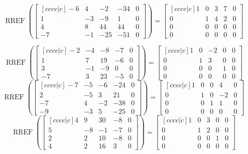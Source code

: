 \documentclass{article}
\DeclareMathOperator{\RREF}{RREF}
\begin{document}


\[\RREF   \left(  \begin{bmatrix}[cccc|c]
    -6 & 4 & -2 & -34 & 0 \\
    1 & -3 & -9 & 1 & 0 \\
    4 & 8 & 44 & 44 & 0 \\
    -7 & -1 & -25 & -51 & 0
  \end{bmatrix}  \right)=
  \begin{bmatrix}[cccc|c]
    1 & 0 & 3 & 7 & 0 \\
    0 & 1 & 4 & 2 & 0 \\
    0 & 0 & 0 & 0 & 0 \\
    0 & 0 & 0 & 0 & 0
  \end{bmatrix} 
\]


\[\RREF   \left(   \begin{bmatrix}[cccc|c]
    -2 & -4 & -8 & -7 & 0 \\
    1 & 7 & 19 & -6& 0 \\
    3 & -1 & -9 & 0 & 0 \\
    -7 & 3 & 23 & -5 & 0
  \end{bmatrix} \right)=
  \begin{bmatrix}[cccc|c]
    1 & 0 & -2 & 0 & 0 \\
    0 & 1 & 3 & 0 & 0 \\
    0 & 0 & 0 & 1 & 0 \\
    0 & 0 & 0 & 0 & 0
  \end{bmatrix} 
\]
%
\[ \RREF \left(  \begin{bmatrix}[cccc|c]
    -7 & -5 & -6 & -24 & 0 \\
    2 & -5 & 3 & 21 & 0 \\
    -7 & 4 & -2 & -38 & 0 \\
    -9 & -3 & 5 & -25 & 0
  \end{bmatrix} \right)=
  \begin{bmatrix}[cccc|c]
    1 & 0 & 0 & 4 & 0 \\
    0 & 1 & 0 & -2 & 0 \\
    0 & 0 & 1 & 1 & 0 \\
    0 & 0 & 0 & 0 & 0
  \end{bmatrix} 
\]
%
\[ \RREF   \left( \begin{bmatrix}[cccc|c]
    4 & 9 & 30 & -8 & 0 \\
    5 & -8 & -1 & -7& 0 \\
    2 & 2 & 10 & -8 & 0 \\
    4 & 2 & 16 & 3 & 0
  \end{bmatrix}  \right)=
  \begin{bmatrix}[cccc|c]
    1 & 0 & 3 & 0 & 0 \\
    0 & 1 & 2 & 0 & 0 \\
    0 & 0 & 0 & 1 & 0 \\
    0 & 0 & 0 & 0 & 0
  \end{bmatrix}
\]
\end{document}
